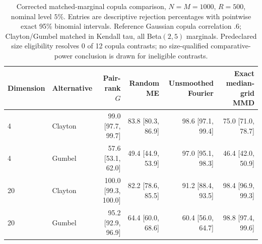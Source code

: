 \begin{table}[t]
\centering
\scriptsize
\caption{Corrected matched-marginal copula comparison, $N=M=1000$, $R=500$, nominal level $5\%$. Entries are descriptive rejection percentages with pointwise exact 95\% binomial intervals. Reference Gaussian copula correlation $.6$; Clayton/Gumbel matched in Kendall tau, all Beta$(2,5)$ marginals. Predeclared size eligibility resolves 0 of 12 copula contrasts; no size-qualified comparative-power conclusion is drawn for ineligible contrasts.}
\label{tab:dependence-copula-power}
{\setlength{\tabcolsep}{8pt}\renewcommand{\arraystretch}{1.2}
\begin{tabular}{llrrrr}
\toprule
Dimension & Alternative & Pair-rank $G$ & Random ME & Unsmoothed Fourier & Exact median-grid MMD\\
\midrule
4 & Clayton & 99.0 [97.7, 99.7] & 83.8 [80.3, 86.9] & 98.6 [97.1, 99.4] & 75.0 [71.0, 78.7]\\
4 & Gumbel & 57.6 [53.1, 62.0] & 49.4 [44.9, 53.9] & 97.0 [95.1, 98.3] & 46.4 [42.0, 50.9]\\
20 & Clayton & 100.0 [99.3, 100.0] & 82.2 [78.6, 85.5] & 91.2 [88.4, 93.5] & 98.4 [96.9, 99.3]\\
20 & Gumbel & 95.2 [92.9, 96.9] & 64.4 [60.0, 68.6] & 60.4 [56.0, 64.7] & 98.8 [97.4, 99.6]\\
\bottomrule
\end{tabular}}
\end{table}

